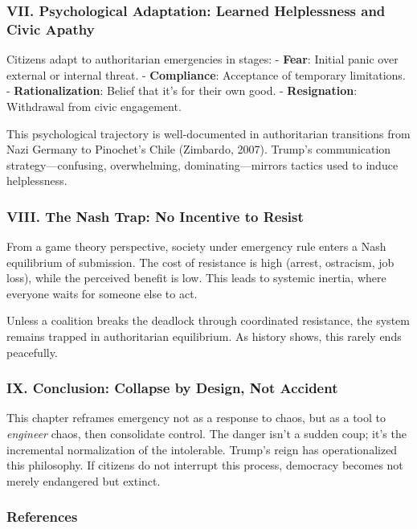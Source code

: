 \documentclass[
]{article}
\begin{document}
\subsubsection{VII. Psychological Adaptation: Learned Helplessness and Civic Apathy}\label{vii.-psychological-adaptation-learned-helplessness-and-civic-apathy}

Citizens adapt to authoritarian emergencies in stages:
- \textbf{Fear}: Initial panic over external or internal threat.
- \textbf{Compliance}: Acceptance of temporary limitations.
- \textbf{Rationalization}: Belief that it's for their own good.
- \textbf{Resignation}: Withdrawal from civic engagement.

This psychological trajectory is well-documented in authoritarian transitions from Nazi Germany to Pinochet's Chile (Zimbardo, 2007). Trump's communication strategy---confusing, overwhelming, dominating---mirrors tactics used to induce helplessness.

\subsubsection{VIII. The Nash Trap: No Incentive to Resist}\label{viii.-the-nash-trap-no-incentive-to-resist}

From a game theory perspective, society under emergency rule enters a Nash equilibrium of submission. The cost of resistance is high (arrest, ostracism, job loss), while the perceived benefit is low. This leads to systemic inertia, where everyone waits for someone else to act.

Unless a coalition breaks the deadlock through coordinated resistance, the system remains trapped in authoritarian equilibrium. As history shows, this rarely ends peacefully.

\subsubsection{IX. Conclusion: Collapse by Design, Not Accident}\label{ix.-conclusion-collapse-by-design-not-accident}

This chapter reframes emergency not as a response to chaos, but as a tool to \emph{engineer} chaos, then consolidate control. The danger isn't a sudden coup; it's the incremental normalization of the intolerable. Trump's reign has operationalized this philosophy. If citizens do not interrupt this process, democracy becomes not merely endangered but extinct.

\subsubsection{References}\label{references}
\end{document}
